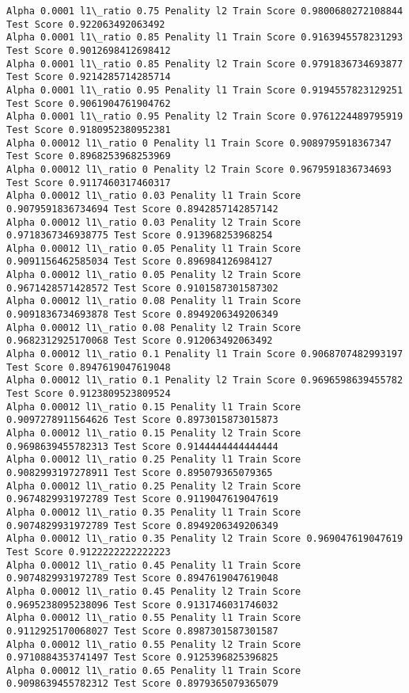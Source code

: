 \documentclass[11pt]{article}
\begin{document}
\begin{Verbatim}[commandchars=\\\{\}]
Alpha 0.0001 l1\_ratio 0.75 Penality l2 Train Score 0.9800680272108844 Test Score 0.922063492063492
Alpha 0.0001 l1\_ratio 0.85 Penality l1 Train Score 0.9163945578231293 Test Score 0.9012698412698412
Alpha 0.0001 l1\_ratio 0.85 Penality l2 Train Score 0.9791836734693877 Test Score 0.9214285714285714
Alpha 0.0001 l1\_ratio 0.95 Penality l1 Train Score 0.9194557823129251 Test Score 0.9061904761904762
Alpha 0.0001 l1\_ratio 0.95 Penality l2 Train Score 0.9761224489795919 Test Score 0.9180952380952381
Alpha 0.00012 l1\_ratio 0 Penality l1 Train Score 0.9089795918367347 Test Score 0.8968253968253969
Alpha 0.00012 l1\_ratio 0 Penality l2 Train Score 0.9679591836734693 Test Score 0.9117460317460317
Alpha 0.00012 l1\_ratio 0.03 Penality l1 Train Score 0.9079591836734694 Test Score 0.8942857142857142
Alpha 0.00012 l1\_ratio 0.03 Penality l2 Train Score 0.9718367346938775 Test Score 0.913968253968254
Alpha 0.00012 l1\_ratio 0.05 Penality l1 Train Score 0.9091156462585034 Test Score 0.896984126984127
Alpha 0.00012 l1\_ratio 0.05 Penality l2 Train Score 0.9671428571428572 Test Score 0.9101587301587302
Alpha 0.00012 l1\_ratio 0.08 Penality l1 Train Score 0.9091836734693878 Test Score 0.8949206349206349
Alpha 0.00012 l1\_ratio 0.08 Penality l2 Train Score 0.9682312925170068 Test Score 0.912063492063492
Alpha 0.00012 l1\_ratio 0.1 Penality l1 Train Score 0.9068707482993197 Test Score 0.8947619047619048
Alpha 0.00012 l1\_ratio 0.1 Penality l2 Train Score 0.9696598639455782 Test Score 0.9123809523809524
Alpha 0.00012 l1\_ratio 0.15 Penality l1 Train Score 0.9097278911564626 Test Score 0.8973015873015873
Alpha 0.00012 l1\_ratio 0.15 Penality l2 Train Score 0.9698639455782313 Test Score 0.9144444444444444
Alpha 0.00012 l1\_ratio 0.25 Penality l1 Train Score 0.9082993197278911 Test Score 0.895079365079365
Alpha 0.00012 l1\_ratio 0.25 Penality l2 Train Score 0.9674829931972789 Test Score 0.9119047619047619
Alpha 0.00012 l1\_ratio 0.35 Penality l1 Train Score 0.9074829931972789 Test Score 0.8949206349206349
Alpha 0.00012 l1\_ratio 0.35 Penality l2 Train Score 0.969047619047619 Test Score 0.9122222222222223
Alpha 0.00012 l1\_ratio 0.45 Penality l1 Train Score 0.9074829931972789 Test Score 0.8947619047619048
Alpha 0.00012 l1\_ratio 0.45 Penality l2 Train Score 0.9695238095238096 Test Score 0.9131746031746032
Alpha 0.00012 l1\_ratio 0.55 Penality l1 Train Score 0.9112925170068027 Test Score 0.8987301587301587
Alpha 0.00012 l1\_ratio 0.55 Penality l2 Train Score 0.9710884353741497 Test Score 0.9125396825396825
Alpha 0.00012 l1\_ratio 0.65 Penality l1 Train Score 0.9098639455782312 Test Score 0.8979365079365079

\end{Verbatim}
\end{document}
